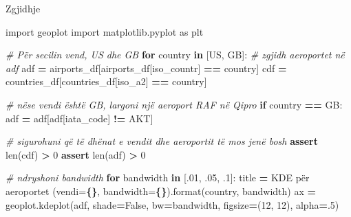 \documentclass[
  ignorenonframetext,
]{beamer}
\newenvironment{Shaded}{\begin{snugshade}}{\end{snugshade}}
\newcommand{\BuiltInTok}[1]{#1}
\newcommand{\CommentTok}[1]{\textcolor[rgb]{0.56,0.35,0.01}{\textit{#1}}}
\newcommand{\ControlFlowTok}[1]{\textcolor[rgb]{0.13,0.29,0.53}{\textbf{#1}}}
\newcommand{\DecValTok}[1]{\textcolor[rgb]{0.00,0.00,0.81}{#1}}
\newcommand{\FloatTok}[1]{\textcolor[rgb]{0.00,0.00,0.81}{#1}}
\newcommand{\ImportTok}[1]{#1}
\newcommand{\KeywordTok}[1]{\textcolor[rgb]{0.13,0.29,0.53}{\textbf{#1}}}
\newcommand{\NormalTok}[1]{#1}
\newcommand{\OperatorTok}[1]{\textcolor[rgb]{0.81,0.36,0.00}{\textbf{#1}}}
\newcommand{\SpecialCharTok}[1]{\textcolor[rgb]{0.81,0.36,0.00}{\textbf{#1}}}
\newcommand{\StringTok}[1]{\textcolor[rgb]{0.31,0.60,0.02}{#1}}
\newcommand{\VariableTok}[1]{\textcolor[rgb]{0.00,0.00,0.00}{#1}}
\begin{document}
\begin{frame}[fragile]{Zgjidhje}
\protect\hypertarget{zgjidhje-24}{}

\begin{Shaded}
\begin{Highlighting}[]
\ImportTok{import}\NormalTok{ geoplot}
\ImportTok{import}\NormalTok{ matplotlib.pyplot }\ImportTok{as}\NormalTok{ plt}

\CommentTok{\# Për secilin vend, \textquotesingle{}US\textquotesingle{} dhe \textquotesingle{}GB\textquotesingle{}}
\ControlFlowTok{for}\NormalTok{ country }\KeywordTok{in}\NormalTok{ [}\StringTok{\textquotesingle{}US\textquotesingle{}}\NormalTok{, }\StringTok{\textquotesingle{}GB\textquotesingle{}}\NormalTok{]:}
    \CommentTok{\# zgjidh aeroportet në adf}
\NormalTok{    adf }\OperatorTok{=}\NormalTok{ airports\_df[airports\_df[}\StringTok{\textquotesingle{}iso\_countr\textquotesingle{}}\NormalTok{] }\OperatorTok{==}\NormalTok{ country]}
\NormalTok{    cdf }\OperatorTok{=}\NormalTok{ countries\_df[countries\_df[}\StringTok{\textquotesingle{}iso\_a2\textquotesingle{}}\NormalTok{] }\OperatorTok{==}\NormalTok{ country]}
    
    \CommentTok{\# nëse vendi është \textquotesingle{}GB\textquotesingle{}, largoni një aeroport RAF në Qipro}
    \ControlFlowTok{if}\NormalTok{ country }\OperatorTok{==} \StringTok{\textquotesingle{}GB\textquotesingle{}}\NormalTok{:}
\NormalTok{        adf }\OperatorTok{=}\NormalTok{ adf[adf[}\StringTok{\textquotesingle{}iata\_code\textquotesingle{}}\NormalTok{] }\OperatorTok{!=} \StringTok{\textquotesingle{}AKT\textquotesingle{}}\NormalTok{]}
    
    \CommentTok{\# sigurohuni që të dhënat e vendit dhe aeroportit të mos jenë bosh}
    \ControlFlowTok{assert} \BuiltInTok{len}\NormalTok{(cdf) }\OperatorTok{\textgreater{}} \DecValTok{0}
    \ControlFlowTok{assert} \BuiltInTok{len}\NormalTok{(adf) }\OperatorTok{\textgreater{}} \DecValTok{0}

    \CommentTok{\# ndryshoni bandwidth}
    \ControlFlowTok{for}\NormalTok{ bandwidth }\KeywordTok{in}\NormalTok{ [}\FloatTok{.01}\NormalTok{, }\FloatTok{.05}\NormalTok{, }\FloatTok{.1}\NormalTok{]:}
\NormalTok{        title }\OperatorTok{=} \StringTok{\textquotesingle{}KDE për aeroportet (vendi=}\SpecialCharTok{\{\}}\StringTok{, bandwidth=}\SpecialCharTok{\{\}}\StringTok{)\textquotesingle{}}\NormalTok{.}\BuiltInTok{format}\NormalTok{(country, bandwidth)}
\NormalTok{        ax }\OperatorTok{=}\NormalTok{ geoplot.kdeplot(adf, shade}\OperatorTok{=}\VariableTok{False}\NormalTok{, bw}\OperatorTok{=}\NormalTok{bandwidth, figsize}\OperatorTok{=}\NormalTok{(}\DecValTok{12}\NormalTok{, }\DecValTok{12}\NormalTok{), alpha}\OperatorTok{=}\FloatTok{.5}\NormalTok{)}
        

\end{Highlighting}
\end{Shaded}
\end{frame}
\end{document}
